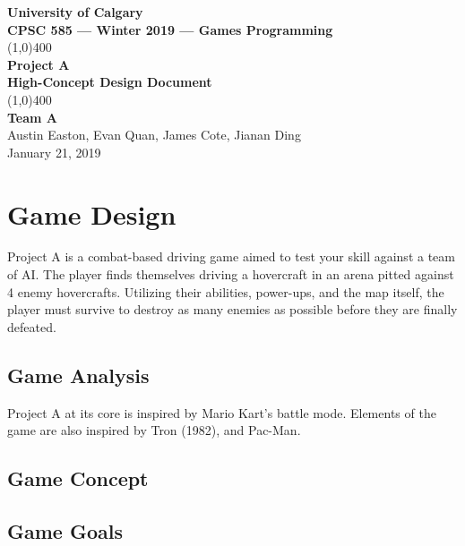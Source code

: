 \documentclass{article}
\newcommand{\name}{Project A}
\newcommand{\team}{Team A}
\newcommand{\botcount}{4}
\theoremstyle{definition}
\begin{document}
\begin{titlepage}
  \begin{center}
    \vspace*{1cm}
    \Large{\textbf{University of Calgary}}\\
    \Large{\textbf{CPSC 585 --- Winter 2019 --- Games Programming}}\\
    \vfill
    \line(1,0){400}\\[1mm]
    \huge{\textbf{\name{}}}\\
    \large{\textbf{High-Concept Design Document}}\\
    \line(1,0){400}\\
    \vfill
    \Large{\textbf{\team{}}}\\
    \Large{Austin Easton, Evan Quan, James Cote, Jianan Ding}\\
    \large{January 21, 2019}
  \end{center}
\end{titlepage}
\setcounter{page}{0}
\tableofcontents
{}
\break{}

\section{Game Design}

\name{} is a combat-based driving game aimed to test your skill against a team
of AI\@. The player finds themselves driving a hovercraft in an arena pitted
against \botcount{} enemy hovercrafts. Utilizing their abilities, power-ups,
and the map itself, the player must survive to destroy as many enemies as
possible before they are finally defeated.

\subsection{Game Analysis}

\name{} at its core is inspired by Mario Kart's battle mode. Elements of the
game are also inspired by Tron (1982), and Pac-Man.

\subsection{Game Concept}
\subsection{Game Goals}
\end{document}
